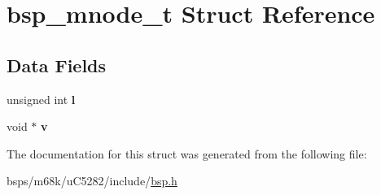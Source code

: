 \hypertarget{structbsp__mnode__t}{}\section{bsp\+\_\+mnode\+\_\+t Struct Reference}
\label{structbsp__mnode__t}
\subsection*{Data Fields}
\begin{DoxyCompactItemize}
\item 
\mbox{\label{structbsp__mnode__t_aa3635d2ed5c671bb43fbed64bca981f1}} 
unsigned int {\bfseries l}
\item 
\mbox{\label{structbsp__mnode__t_a9ff092ce284fcba5c93ef099f62251f4}} 
void $\ast$ {\bfseries v}
\end{DoxyCompactItemize}


The documentation for this struct was generated from the following file\+:\begin{DoxyCompactItemize}
\item 
bsps/m68k/u\+C5282/include/\mbox{\hyperlink{bsps_2m68k_2uC5282_2include_2bsp_8h}{bsp.\+h}}\end{DoxyCompactItemize}

